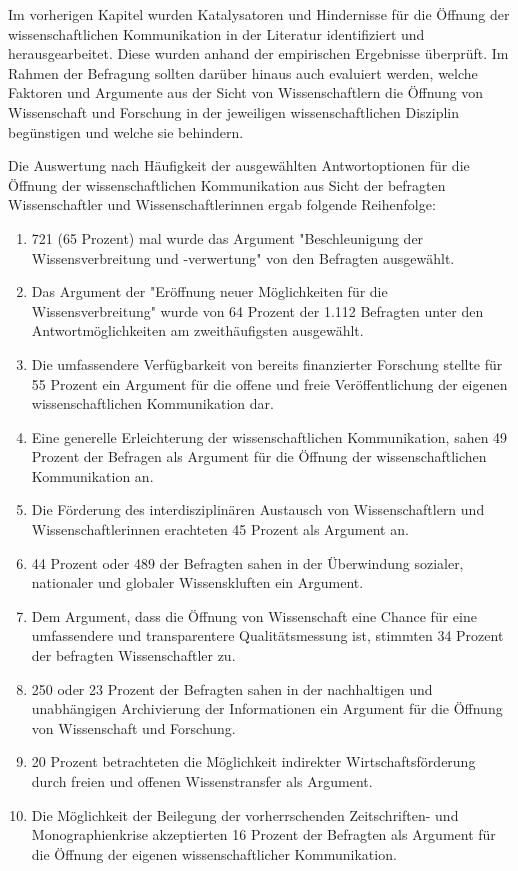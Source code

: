 Im vorherigen Kapitel wurden Katalysatoren und Hindernisse für die Öffnung der wissenschaftlichen Kommunikation in der Literatur identifiziert und herausgearbeitet. Diese wurden anhand der empirischen Ergebnisse überprüft. Im Rahmen der Befragung sollten darüber hinaus auch evaluiert werden, welche Faktoren und Argumente aus der Sicht von Wissenschaftlern die Öffnung von Wissenschaft und Forschung in der jeweiligen wissenschaftlichen Disziplin begünstigen und welche sie behindern.

Die Auswertung nach Häufigkeit der ausgewählten Antwortoptionen für die Öffnung der wissenschaftlichen Kommunikation aus Sicht der befragten Wissenschaftler und Wissenschaftlerinnen ergab folgende Reihenfolge:
\begin{enumerate}
\item 721 (65 Prozent) mal wurde das Argument "Beschleunigung der Wissensverbreitung und -verwertung" von den Befragten ausgewählt.
\item Das Argument der "Eröffnung neuer Möglichkeiten für die Wissensverbreitung" wurde von 64 Prozent der 1.112 Befragten unter den Antwortmöglichkeiten am zweithäufigsten ausgewählt.
\item Die umfassendere Verfügbarkeit von bereits finanzierter Forschung stellte für 55 Prozent ein Argument für die offene und freie Veröffentlichung der eigenen wissenschaftlichen Kommunikation dar.
\item Eine generelle Erleichterung der wissenschaftlichen Kommunikation, sahen 49 Prozent der Befragen als Argument für die Öffnung der wissenschaftlichen Kommunikation an.
\item Die Förderung des interdisziplinären Austausch von Wissenschaftlern und Wissenschaftlerinnen erachteten 45 Prozent als Argument an.
\item 44 Prozent oder 489 der Befragten sahen in der Überwindung sozialer, nationaler und globaler Wissenskluften ein Argument.
\item Dem Argument, dass die Öffnung von Wissenschaft eine Chance für eine umfassendere und transparentere Qualitätsmessung ist, stimmten 34 Prozent der befragten Wissenschaftler zu.
\item 250 oder 23 Prozent der Befragten sahen in der nachhaltigen und unabhängigen Archivierung der Informationen ein Argument für die Öffnung von Wissenschaft und Forschung.
\item 20 Prozent betrachteten die Möglichkeit indirekter Wirtschaftsförderung durch freien und offenen Wissenstransfer als Argument.
\item Die Möglichkeit der Beilegung der vorherrschenden Zeitschriften- und Monographienkrise akzeptierten 16 Prozent der Befragten als Argument für die Öffnung der eigenen wissenschaftlicher Kommunikation.
\end{enumerate}

